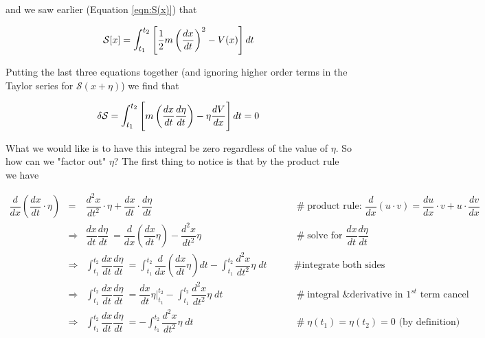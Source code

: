 \documentclass{article}
\theoremstyle{definition}
\begin{document}
\bigskip
\noindent
and we saw earlier (Equation \ref{eqn:S(x)}) that

\begin{equation*}
\mathcal{S}[x] = {\displaystyle \mathlarger{ \int_{t_1}^{t_2}} \left [ \frac{1}{2} m \left ( \dfrac{dx}{dt} \right )^2 - V(x) \right  ] dt}   
\end{equation*}


\bigskip
\noindent
Putting the last three equations together (and ignoring higher order terms in the Taylor series for $\mathcal{S}(x+\eta)$) we find that

\bigskip
\begin{equation*}
\delta \mathcal{S} =  {\displaystyle \mathlarger{ \int_{t_1}^{t_2}}  
\left [  m \left (\dfrac{dx}{dt} \dfrac{d \eta}{dt} \right ) - \eta \dfrac{dV}{dx} \right ] dt }  = 0
\end{equation*}

\medskip
\bigskip
\noindent
What we would like is to have this integral be zero regardless of
the value of $\eta$. So how can we "factor out" $\eta$? The first
thing to notice is that by the product rule
\cite{wiki:product_rule} we have 

\begin{equation*}
\begin{array}{lllll}
\dfrac{d}{dx} \left ( \dfrac{dx}{dt} \cdot \eta \right ) 
&=& \dfrac{d^2x}{dt^2} \cdot  \eta + \dfrac{dx}{dt} \cdot \dfrac{d \eta}{dt}                                
					&\qquad  \mathrel{\#} \text{product rule: ${\displaystyle {\dfrac {d}{dx}}(u\cdot v)={\dfrac {du}{dx}}\cdot v+u\cdot {\dfrac {dv}{dx}}}$}\\
[12pt]
&\Rightarrow& \dfrac{dx}{dt} \dfrac{d \eta}{dt} \ = \dfrac{d}{dx} \left ( \dfrac{dx}{dt} \eta \right )  - \dfrac{d^2x}{dt^2} \eta 
					&\qquad  \mathrel{\#} \text{solve for $\dfrac{dx}{dt} \dfrac{d \eta}{dt}$} \\
[12pt]
&\Rightarrow& {\displaystyle  \int_{t_1}^{t_2} \dfrac{dx}{dt} \dfrac{d \eta}{dt} \ =  \int_{t_1}^{t_2} \dfrac{d}{dx} \left ( \dfrac{dx}{dt} \eta \right ) dt   - \int_{t_1}^{t_2}  \dfrac{d^2x}{dt^2} \eta \; dt} 
					&\qquad \mathrel{\#} \text{integrate both sides} \\
[12pt]
&\Rightarrow& {\displaystyle  \int_{t_1}^{t_2} \dfrac{dx}{dt} \dfrac{d \eta}{dt} \ =  \dfrac{dx}{dt} \eta \bigg |^{t_2}_{t_1} - \int_{t_1}^{t_2}  \dfrac{d^2x}{dt^2} \eta \; dt} 
					&\qquad \mathrel{\#} \text{integral \& derivative in $1^{st}$ term cancel} \\
[12pt]
&\Rightarrow& {\displaystyle  \int_{t_1}^{t_2} \dfrac{dx}{dt} \dfrac{d \eta}{dt} \ =   - \int_{t_1}^{t_2}  \dfrac{d^2x}{dt^2} \eta \; dt}                   
					&\qquad \mathrel{\#} \text{$\eta(t_1) = \eta(t_2) = 0$ (by definition)}
\end{array}
\end{equation*}
\end{document}
